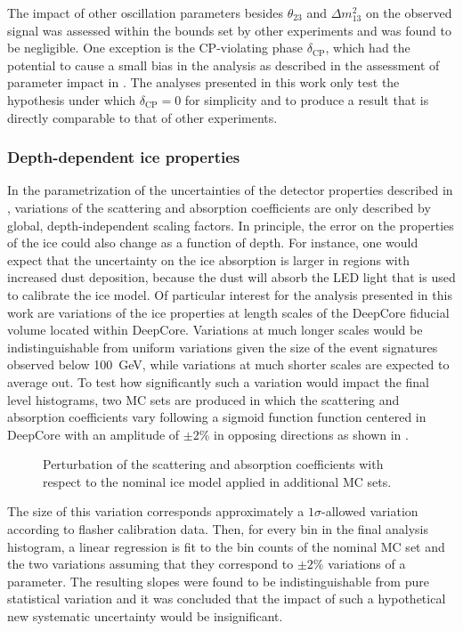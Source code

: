 The impact of other oscillation parameters besides $\theta_{23}$ and $\Delta m^2_{13}$ on the observed signal was assessed within the bounds set by other experiments and was found to be negligible. One exception is the CP-violating phase $\delta_{\mathrm{CP}}$, which had the potential to cause a small bias in the analysis as described in the assessment of parameter impact in . The analyses presented in this work only test the hypothesis under which $\delta_{\mathrm{CP}}=0$ for simplicity and to produce a result that is directly comparable to that of other experiments.

\subsubsection{Depth-dependent ice properties}
\label{sec:depth-dependent-ice-properties}

In the parametrization of the uncertainties of the detector properties described in , variations of the scattering and absorption coefficients are only described by global, depth-independent scaling factors. In principle, the error on the properties of the ice could also change as a function of depth. For instance, one would expect that the uncertainty on the ice absorption is larger in regions with increased dust deposition, because the dust will absorb the LED light that is used to calibrate the ice model. Of particular interest for the analysis presented in this work are variations of the ice properties at length scales of the DeepCore fiducial volume located within DeepCore. Variations at much longer scales would be indistinguishable from uniform variations given the size of the event signatures observed below 100~GeV, while variations at much shorter scales are expected to average out. To test how significantly such a variation would impact the final level histograms, two MC sets are produced in which the scattering and absorption coefficients vary following a sigmoid function function centered in DeepCore with an amplitude of $\pm 2\%$ in opposing directions as shown in .
\begin{figure}
    \centering
    \caption{Perturbation of the scattering and absorption coefficients with respect to the nominal ice model applied in additional MC sets.}
    \label{fig:step-function-ice-model}
\end{figure}
The size of this variation corresponds approximately a $1\sigma$-allowed variation according to flasher calibration data. Then, for every bin in the final analysis histogram, a linear regression is fit to the bin counts of the nominal MC set and the two variations assuming that they correspond to $\pm 2\%$ variations of a parameter. The resulting slopes were found to be indistinguishable from pure statistical variation and it was concluded that the impact of such a hypothetical new systematic uncertainty would be insignificant.

